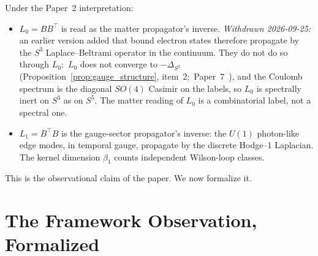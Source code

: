 \documentclass[aps,pra,twocolumn,superscriptaddress,longbibliography]{revtex4-2}
\begin{document}
Under the Paper~2 interpretation:
\begin{itemize}
\item $L_0 = B B^{\top}$ is read as the matter propagator's inverse.
  \emph{Withdrawn 2026-09-25:} an earlier version added that bound
  electron states therefore propagate by the $S^3$ Laplace--Beltrami
  operator in the continuum.  They do not do so through $L_0$:\ $L_0$
  does not converge to $-\Delta_{S^3}$ (Proposition~\ref{prop:gauge_structure},
  item~2;\ Paper~7~\cite{Paper7}), and the Coulomb spectrum is the
  diagonal $SO(4)$ Casimir on the labels, so $L_0$ is spectrally inert
  on $S^3$ as on $S^5$.  The matter reading of $L_0$ is a combinatorial
  label, not a spectral one.
\item $L_1 = B^{\top} B$ is the gauge-sector propagator's inverse:
  the $U(1)$ photon-like edge modes, in temporal gauge, propagate by
  the discrete Hodge--1 Laplacian.  The kernel dimension
  $\beta_1$ counts independent Wilson-loop classes.
\end{itemize}
This is the observational claim of the paper.  We now formalize it.


\section{The Framework Observation, Formalized}
\label{sec:framework}
\end{document}
